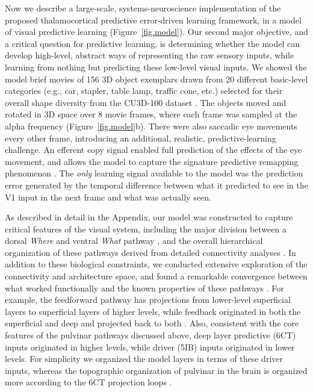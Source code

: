 \documentclass[11pt,twoside]{article}
\newif\myifpdf
\begin{document}
Now we describe a large-scale, systems-neuroscience implementation of the proposed thalamocortical predictive error-driven learning framework, in a model of visual predictive learning (Figure~\ref{fig.model}).  Our second major objective, and a critical question for predictive learning, is determining whether the model can develop high-level, abstract ways of representing the raw sensory inputs, while learning from nothing but predicting these low-level visual inputs.  We showed the model brief movies of 156 3D object exemplars drawn from 20 different basic-level categories (e.g., car, stapler, table lamp, traffic cone, etc.) selected for their overall shape diversity from the CU3D-100 dataset \citep{OReillyWyatteHerdEtAl13}.  The objects moved and rotated in 3D space over 8 movie frames, where each frame was sampled at the alpha frequency (Figure~\ref{fig.model}b).  There were also saccadic eye movements every other frame, introducing an additional, realistic, predictive-learning challenge.  An efferent copy signal enabled full prediction of the effects of the eye movement, and allows the model to capture the signature predictive remapping phenomenon \citep{DuhamelColbyGoldberg92,CavanaghHuntAfrazEtAl10,NeupaneGuittonPack17}.  The \emph{only} learning signal available to the model was the prediction error generated by the temporal difference between what it predicted to see in the V1 input in the next frame and what was actually seen.

As described in detail in the Appendix, our model was constructed to capture critical features of the visual system, including the major division between a dorsal \emph{Where} and ventral \emph{What} pathway \citep{UngerleiderMishkin82}, and the overall hierarchical organization of these pathways derived from detailed connectivity analyses \citep{RocklandPandya79,FellemanVanEssen91,MarkovVezoliChameauEtAl14,MarkovErcsey-RavaszGomesEtAl14}.  In addition to these biological constraints, we conducted extensive exploration of the connectivity and architecture space, and found a remarkable convergence between what worked functionally and the known properties of these pathways \citep{OReillyWyatteRohrlich17}.  For example, the feedforward pathway has projections from lower-level superficial layers to superficial layers of higher levels, while feedback originated in both the superficial and deep and projected back to both \citep{RocklandPandya79,FellemanVanEssen91}.  Also, consistent with the core features of the pulvinar pathways discussed above, deep layer predictive (6CT) inputs originated in higher levels, while driver (5IB) inputs originated in lower levels.  For simplicity we organized the model layers in terms of these driver inputs, whereas the topographic organization of pulvinar in the brain is organized more according to the 6CT projection loops \citep{Shipp03}.
\end{document}
